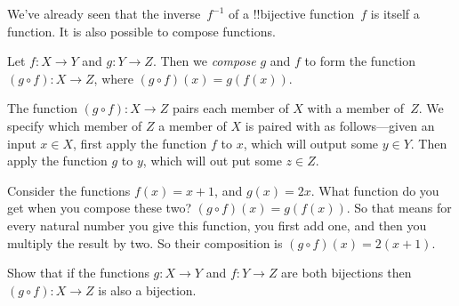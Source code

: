 \documentclass[../../include/open-logic-section]{subfiles}
\begin{document}

\begin{explain}
We've already seen that the inverse~$f^{-1}$ of a !!{bijective}
function~$f$ is itself a function. It is also possible to compose
functions.
\end{explain}

\begin{defn}
 Let $f: X \rightarrow Y$ and $g: Y \rightarrow Z$. Then we
 \emph{compose} $g$ and $f$ to form the function $(g \circ f) \colon X
 \rightarrow Z$, where $(g \circ f)(x) = g(f(x))$.
\end{defn}

\begin{explain}
The function $(g \circ f) \colon X \rightarrow Z$ pairs each member of
$X$ with a member of~$Z$. We specify which member of $Z$ a member of
$X$ is paired with as follows---given an input $x \in X$, first apply
the function $f$ to $x$, which will output some $y \in Y$. Then apply
the function $g$ to $y$, which will out put some $z \in Z$.
\end{explain}

\begin{ex}
Consider the functions $f(x) = x + 1$, and $g(x) = 2x$. What function
do you get when you compose these two? $(g \circ f)(x) = g(f(x))$. So
that means for every natural number you give this function, you first
add one, and then you multiply the result by two. So their composition
is $(g \circ f)(x) = 2(x+1)$.
\end{ex}

\begin{prob}
Show that if the functions $g \colon X \rightarrow Y$ and $f \colon Y
\rightarrow Z$ are both bijections then $(g \circ f) \colon X
\rightarrow Z$ is also a bijection.
\end{prob}
\end{document}
